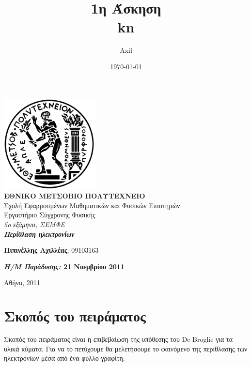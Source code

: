 \documentclass[a4paper,12pt,titlepage]{article}
\title{1η Άσκηση\\kn}
\author{Axil}
\date{\today}
\begin{document}
\pagestyle{headings}    %

\begin{titlepage}
\begin{center}
\includegraphics[width=50mm]{pyrforos.pdf}\\[0.5cm]
\textbf{\LARGE ΕΘΝΙΚΟ ΜΕΤΣΟΒΙΟ ΠΟΛΥΤΕΧΝΕΙΟ}\\
\textrm{\Large Σχολή Εφαρμοσμένων Μαθηματικών και Φυσικών Επιστημών}\\[2.0cm]
\Huge{Εργαστήριο Σύγχρονης Φυσικής}\\
\Large{\textit{5o εξάμηνο, ΣΕΜΦΕ}}\\[2.0cm]
\Large{\textit{\textbf{Περίθλαση ηλεκτρονίων}}}\\[5.0cm]
\normalsize
\begin{minipage}{0.49\textwidth}
\begin{flushleft}
\textbf{Πιπινέλλης Αχιλλέας}, 09103163
\end{flushleft}
\end{minipage}
\begin{minipage}{0.49\textwidth}
\begin{flushright}
\textbf{\textit{Η/Μ Παράδοσης:} 21 Νοεμβρίου 2011}
\end{flushright}
\end{minipage}

\vfill
{Αθήνα, 2011}

\end{center}
\end{titlepage}


\section{Σκοπός του πειράματος}
Σκοπός του πειράματος είναι η επιβεβαίωση της υπόθεσης του De Broglie για τα υλικά κύματα. Για να το πετύχουμε θα μελετήσουμε το φαινόμενο της περίθλασης των ηλεκτρονίων μέσα από ένα φύλλο γραφίτη.
\end{document}
